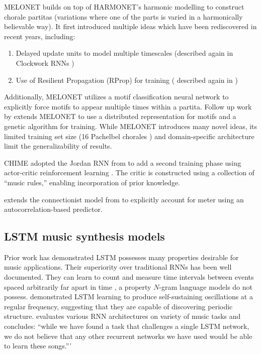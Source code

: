 MELONET \citep{feulner1994melonet} builds on top of HARMONET's harmonic
modelling to construct chorale partitas (\ie variations where one of the
parts is varied in a harmonically believable way). It first introduced multiple
ideas which have been rediscovered in recent years, including:
\begin{enumerate}
  \item Delayed update units to model multiple timescales (described again in Clockwork
  RNNs \citep{Koutnik2014})
  \item Use of Resilient Propagation (RProp) \citep{riedmiller1993direct} for training (
  described again in \citet{Liu2014})
\end{enumerate}
Additionally, MELONET utilizes a motif classification neural network to
explicitly force motifs to appear multiple times within a partita.
Follow up work by \citet{hornel1996learning} extends MELONET to use a distributed
representation for motifs and a genetic algorithm for training.
While MELONET introduces many novel ideas, its limited training set size
(16 Pachelbel chorales \citep{hornel1997melonet}) and domain-specific
architecture limit the generalizability of results. 

CHIME \citep{franklin2001learning} adopted the Jordan RNN from
\citet{todd1989connectionist} to add a second training phase using actor-critic
reinforcement learning \citep{sutton1998reinforcement}. The critic is
constructed using a collection of ``music rules,'' enabling incorporation of
prior knowledge.

\citet{eck2008learning} extends the connectionist model from \citet{Eck2002}
to explicitly account for meter using an autocorrelation-based predictor.

\subsection{LSTM music synthesis models}

Prior work has demonstrated LSTM possesses many properties desirable for music
applications. Their superiority over traditional RNNs has been well
documented\citep{gers2001lstm}. They can learn to count and measure time
intervals between events spaced arbitrarily far apart in time
\citep{gers2000recurrent}, a property $N$-gram language models do not possess.
\citet{gers2002learning} demonstrated LSTM learning to produce self-sustaining
oscillations at a regular frequency, suggesting that they are capable of
discovering periodic structure. \citet{franklin2006recurrent} evaluates various
RNN architectures on variety of music tasks and concludes: ``while we have
found a task that challenges a single LSTM network, we do not believe that any
other recurrent networks we have used would be able to learn these songs.'''

